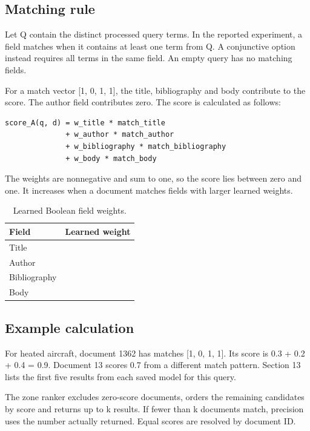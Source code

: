 \documentclass[12pt,a4paper]{article}
\begin{document}
\subsection{Matching rule}
Let Q contain the distinct processed query terms. In the reported experiment, a field matches when it contains at least one term from Q. A conjunctive option instead requires all terms in the same field. An empty query has no matching fields.

For a match vector [1, 0, 1, 1], the title, bibliography and body contribute to the score. The author field contributes zero. The score is calculated as follows:

\begin{small}\begin{verbatim}
score_A(q, d) = w_title * match_title
              + w_author * match_author
              + w_bibliography * match_bibliography
              + w_body * match_body
\end{verbatim}\end{small}
The weights are nonnegative and sum to one, so the score lies between zero and one. It increases when a document matches fields with larger learned weights.

\begin{table}[htbp]\centering\small
\caption{Learned Boolean field weights.}
\begin{tabularx}{\linewidth}{>{\raggedright\arraybackslash}X>{\raggedright\arraybackslash}X}
\toprule
\textbf{Field} & \textbf{Learned weight} \\\midrule
Title & 0.3 \\
Author & 0.1 \\
Bibliography & 0.2 \\
Body & 0.4 \\
\bottomrule\end{tabularx}\end{table}
\subsection{Example calculation}
For heated aircraft, document 1362 has matches [1, 0, 1, 1]. Its score is 0.3 + 0.2 + 0.4 = 0.9. Document 13 scores 0.7 from a different match pattern. Section 13 lists the first five results from each saved model for this query.

The zone ranker excludes zero-score documents, orders the remaining candidates by score and returns up to k results. If fewer than k documents match, precision uses the number actually returned. Equal scores are resolved by document ID.
\end{document}
